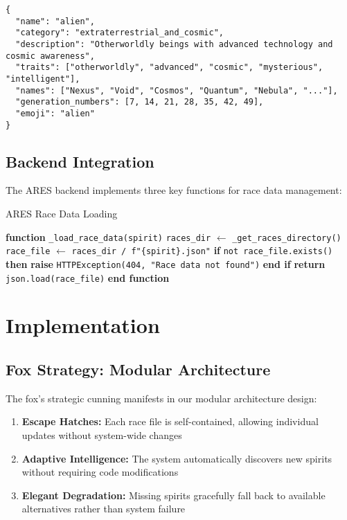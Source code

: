 \documentclass[11pt,a4paper]{article}
\begin{document}
\begin{verbatim}
{
  "name": "alien",
  "category": "extraterrestrial_and_cosmic",
  "description": "Otherworldly beings with advanced technology and cosmic awareness",
  "traits": ["otherworldly", "advanced", "cosmic", "mysterious", "intelligent"],
  "names": ["Nexus", "Void", "Cosmos", "Quantum", "Nebula", "..."],
  "generation_numbers": [7, 14, 21, 28, 35, 42, 49],
  "emoji": "alien"
}
\end{verbatim}

\subsection{Backend Integration}

The ARES backend implements three key functions for race data management:

\begin{algorithm}
\caption{ARES Race Data Loading}
\begin{algorithmic}
\STATE \textbf{function} \texttt{\_load\_race\_data(spirit)}
\STATE \quad \texttt{races\_dir} $\leftarrow$ \texttt{\_get\_races\_directory()}
\STATE \quad \texttt{race\_file} $\leftarrow$ \texttt{races\_dir / f"\{spirit\}.json"}
\STATE \quad \textbf{if} \texttt{not race\_file.exists()} \textbf{then}
\STATE \quad \quad \textbf{raise} \texttt{HTTPException(404, "Race data not found")}
\STATE \quad \textbf{end if}
\STATE \quad \textbf{return} \texttt{json.load(race\_file)}
\STATE \textbf{end function}
\end{algorithmic}
\end{algorithm}

\section{Implementation}

\subsection{Fox Strategy: Modular Architecture}

The fox's strategic cunning manifests in our modular architecture design:

\begin{enumerate}
    \item \textbf{Escape Hatches:} Each race file is self-contained, allowing individual updates without system-wide changes
    \item \textbf{Adaptive Intelligence:} The system automatically discovers new spirits without requiring code modifications
    \item \textbf{Elegant Degradation:} Missing spirits gracefully fall back to available alternatives rather than system failure
\end{enumerate}
\end{document}
